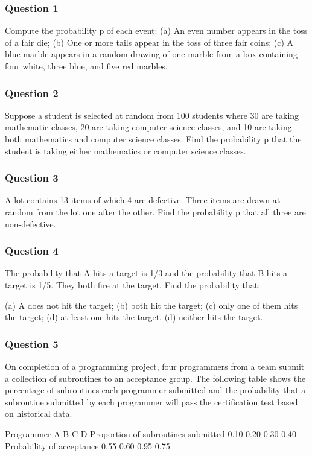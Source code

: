 \documentclass[IntroMain.tex]{subfiles}
\begin{document}
\begin{frame}
\frametitle{Question 1}
Compute the probability p of each event:
(a) An even number appears in the toss of a fair die;
(b) One or more tails appear in the toss of three fair coins;
(c) A blue marble appears in a random drawing of one marble from a box containing four white, three blue, and five red marbles.

\end{frame}
\begin{frame}
\frametitle{Question 2}
Suppose a student is selected at random from 100 students where 30 are taking mathematic classes, 20 are taking computer science classes, and 10 are taking  both mathematics and computer science classes. Find the probability p that the student is taking either mathematics or computer science classes.

\end{frame}
\begin{frame}
\frametitle{Question 3}
A lot contains 13 items of which 4 are defective. Three items are drawn at random from the lot one after the other. Find the probability p that all three are non-defective.

\end{frame}
\begin{frame}
\frametitle{Question 4}

The probability that A hits a target is 1/3 and the probability that B hits a target is 1/5.  They both fire at the target. Find the probability that:

(a) A does not hit the target; 
(b) both hit the target; 
(c) only one of them hits the target; 
(d) at least one hits the target.
(d) neither hits the target.

\end{frame}
\begin{frame}
\frametitle{Question 5}

On completion of a programming project, four programmers from a team submit a collection of subroutines to an acceptance group. The following table shows the percentage of subroutines each programmer submitted and the probability that a subroutine submitted by each programmer will pass the certification test based on historical data.

Programmer	A	B	C	D
Proportion of subroutines submitted	0.10	0.20	0.30	0.40
Probability of acceptance	0.55	0.60	0.95	0.75


\end{frame}
\end{document}
